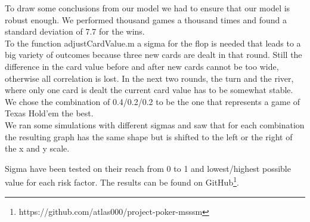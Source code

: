 \documentclass[11pt]{article}
\begin{document}
To draw some conclusions from our model we had to ensure that our model is robust enough. We performed thousand games a thousand times and found a standard deviation of 7.7 for the wins.\\

To the function adjustCardValue.m a sigma for the flop is needed that leads to a big variety of outcomes because three new cards are dealt in that round. Still the difference in the card value before and after new cards cannot be too wide, otherwise all correlation is lost. In the next two rounds, the turn and the river, where only one card is dealt the current card value has to be somewhat stable.\\

We chose the combination of 0.4/0.2/0.2 to be the one that represents a game of Texas Hold'em the best. \\

We ran some simulations with different sigmas and saw that for each combination the resulting graph has the same shape but is shifted to the left or the right of the x and y scale.

Sigma have been tested on their reach from 0 to 1 and lowest/highest possible value for each risk factor. The results can be found on GitHub\footnote{https://github.com/atlas000/project-poker-msssm}.
\end{document}
